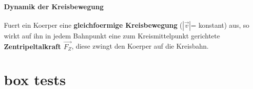 \documentclass{report}
\begin{document}
\paragraph{Dynamik der Kreisbewegung}
Fuert ein Koerper eine \textbf{gleichfoermige Kreisbewegung} ($|\vec{v}|$=
konstant) aus, so wirkt auf ihn in jedem Bahnpunkt eine zum Kreismittelpunkt
gerichtete \textbf{Zentripeltalkraft $\vec{F_Z}$}, diese zwingt den Koerper auf
die Kreisbahn. 



\section{box tests}
\end{document}
